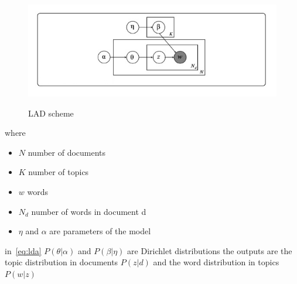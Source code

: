 \begin{figure}
	\centering
	\includegraphics[width=0.5\linewidth]{pictures/topic/LDA.jpeg}
	\label{fig:LDA}
	\caption{LAD scheme}
\end{figure}
where
\begin{itemize}
	\item $N$ number of documents
	\item $K$ number of topics
	\item $w$ words
	\item $N_d$ number of words in document d
	\item $\eta$ and $\alpha$ are parameters of the model
\end{itemize}
in~\ref{eq:lda} $P(\theta | \alpha)$ and $P(\beta|\eta)$ are Dirichlet distributions the outputs are the topic distribution in documents $P(z|d)$ and the word distribution in topics $P(w|z)$